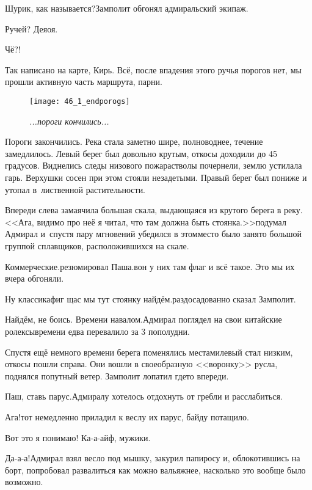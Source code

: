\diagdash Шурик, как называется?\mdash Замполит обгонял адмиральский экипаж.

\diagdash Ручей? Деяоя.

\diagdash Чё?!

\diagdash Так написано на карте, Кирь. Всё, после впадения этого ручья порогов нет, мы прошли активную часть маршрута, парни.

\begin{figure}[h]
	\centering
	\texttt{[image: 46\_1\_endporogs]}
	\caption{\small\textit{...пороги кончились...}}
\end{figure}

Пороги закончились. Река стала заметно шире, полноводнее, течение замедлилось. Левый берег был довольно крутым, откосы доходили до 45 градусов. Виднелись следы низового пожара\mdash стволы почернели, землю устилала гарь. Верхушки сосен при этом стояли незадетыми. Правый берег был пониже и утопал в~лиственной растительности. 

Впереди слева замаячила большая скала, выдающаяся из крутого берега в реку. <<Ага, видимо про неё я читал, что там должна быть стоянка.>>\mdash подумал Адмирал и~спустя пару мгновений убедился в этом\mdash место было занято большой группой сплавщиков, расположившихся на скале.

\diagdash Коммерческие.\mdash резюмировал Паша.\mdash вон у них там флаг и всё такое. Это мы их вчера обгоняли.

\diagdash Ну классика\mdash фиг щас мы тут стоянку найдём.\mdash раздосадованно сказал Замполит.

\diagdash Найдём, не боись. Времени навалом.\mdash Адмирал поглядел на свои китайские ролексы\mdash времени едва перевалило за 3 пополудни.

Спустя ещё немного времени берега поменялись местами\mdash левый стал низким, откосы пошли справа. Они вошли в своеобразную <<воронку>> русла, поднялся попутный ветер. Замполит лопатил где\sdash то впереди.

\diagdash Паш, ставь парус.\mdash Адмиралу хотелось отдохнуть от гребли и расслабиться.

\diagdash Ага!\mdash тот немедленно приладил к веслу их парус, байду потащило.

\diagdash Вот это я понимаю! Ка-а-айф, мужики.

\diagdash Да-а-а!\mdash Адмирал взял весло под мышку, закурил папиросу и, облокотившись на борт, попробовал развалиться как можно вальяжнее, насколько это вообще было возможно. 

